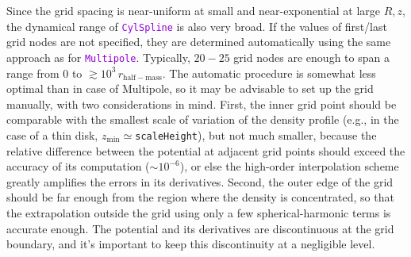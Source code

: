 \documentclass[12pt]{article}
\newcommand{\ttt}[1]{\textcolor{darkviolet}{\texttt{#1}}}
\begin{document}
Since the grid spacing is near-uniform at small and near-exponential at large $R,z$, the dynamical range of \ttt{CylSpline} is also very broad. If the values of first/last grid nodes are not specified, they are determined automatically using the same approach as for \ttt{Multipole}. Typically, $20-25$ grid nodes are enough to span a range from 0 to $\gtrsim 10^3\,r_\mathrm{half-mass}$.
The automatic procedure is somewhat less optimal than in case of Multipole, so it may be advisable to set up the grid manually, with two considerations in mind. First, the inner grid point should be comparable with the smallest scale of variation of the density profile (e.g., in the case of a thin disk, $z_\mathrm{min} \simeq{}$\texttt{scaleHeight}), but not much smaller, because the relative difference between the potential at adjacent grid points should exceed the accuracy of its computation ($\sim10^{-6}$), or else the high-order interpolation scheme greatly amplifies the errors in its derivatives. Second, the outer edge of the grid should be far enough from the region where the density is concentrated, so that the extrapolation outside the grid using only a few spherical-harmonic terms is accurate enough. The potential and its derivatives are discontinuous at the grid boundary, and it's important to keep this discontinuity at a negligible level.
\end{document}
